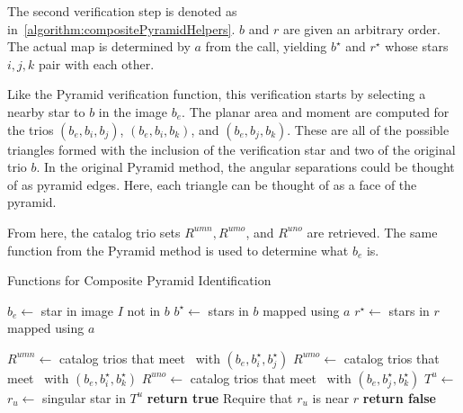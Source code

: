 The second verification step is denoted as 
in~\autoref{algorithm:compositePyramidHelpers}.
$b$ and $r$ are given an arbitrary order.
The actual map is determined by $a$ from the  call, yielding $b^{\star}$ and $r^{\star}$ whose stars $i, j,
k$ pair with each other.

Like the Pyramid verification function, this verification starts by selecting a nearby star to $b$ in the image $b_e$.
The planar area and moment are computed for the trios $(b_e, b_i, b_j)$, $(b_e, b_i, b_k)$, and $(b_e, b_j, b_k)$.
These are all of the possible triangles formed with the inclusion of the verification star and two of the original
trio $b$.
In the original Pyramid method, the angular separations could be thought of as pyramid edges.
Here, each triangle can be thought of as a face of the pyramid.

From here, the catalog trio sets $R^{umn}, R^{umo}$, and $R^{uno}$ are retrieved.
The same function  from the Pyramid method is used to determine what $b_e$ is.
\begin{algorithm}
    \caption{Functions for Composite Pyramid Identification} \label{algorithm:compositePyramidHelpers}
    \begin{algorithmic}[1]
        \State $b_e \gets $ star in image $I$ not in $b$
        \State $b^{\star} \gets $ stars in $b$ mapped using $a$
        \State $r^{\star} \gets $ stars in $r$ mapped using $a$

        \State $R^{umn} \gets $ catalog trios that meet~ with $(b_e, b^{\star}_i,
        b^{\star}_j)$
        \State $R^{umo} \gets $ catalog trios that meet~ with $(b_e, b^{\star}_i,
        b^{\star}_k)$
        \State $R^{uno} \gets $ catalog trios that meet~ with $(b_e, b^{\star}_j,
        b^{\star}_k)$
        \State $T^u \gets $ 
        \\
        \State $r_u \gets $ singular star in $T^u$
        \State \textbf{return true} \Comment Require that $r_u$ is near $r$
        \EndIf
        \EndIf
        \State \textbf{return false}
        \EndFunction
    \end{algorithmic}
\end{algorithm}

\begin{table*}[ht]
\end{table*}